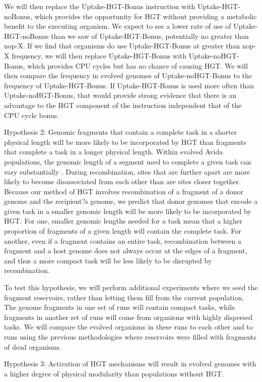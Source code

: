 \begin{mdframed}
We will then replace the Uptake-HGT-Bonus instruction with Uptake-HGT-noBonus, which provides the opportunity for HGT without providing a metabolic benefit to the executing organism. We expect to see a lower rate of use of Uptake-HGT-noBonus than we saw of Uptake-HGT-Bonus, potentially no greater than nop-X. If we find that organisms do use Uptake-HGT-Bonus at greater than nop-X frequency, we will then replace Uptake-HGT-Bonus with Uptake-noHGT-Bonus, which provides CPU cycles but has no chance of causing HGT. We will then compare the frequency in evolved genomes of Uptake-noHGT-Bonus to the frequency of Uptake-HGT-Bonus. If Uptake-HGT-Bonus is used more often than Uptake-noHGT-Bonus, that would provide strong evidence that there is an advantage to the HGT component of the instruction independent that of the CPU cycle bonus. 

Hypothesis 2: Genomic fragments that contain a complete task in a shorter physical length will be more likely to be incorporated by HGT than fragments that complete a task in a longer physical length. Within evolved Avida populations, the genomic length of a segment used to complete a given task can vary substantially \cite{ComplexFeat}. During recombination, sites that are further apart are more likely to become disassociated from each other than are sites closer together. Because our method of HGT involves recombination of a fragment of a donor genome and the recipient?s genome, we predict that donor genomes that encode a given task in a smaller genomic length will be more likely to be incorporated by HGT. For one, smaller genomic lengths needed for a task mean that a higher proportion of fragments of a given length will contain the complete task. For another, even if a fragment contains an entire task, recombination between a fragment and a host genome does not always occur at the edges of a fragment, and thus a more compact task will be less likely to be disrupted by recombination. 

To test this hypothesis, we will perform additional experiments where we seed the fragment reservoirs, rather than letting them fill from the current population. The genome fragments in one set of runs will contain compact tasks, while fragments in another set of runs will come from organisms with highly dispersed tasks. We will compare the evolved organisms in these runs to each other and to runs using the previous methodologies where reservoirs were filled with fragments of dead organisms. 

Hypothesis 3: Activation of HGT mechanisms will result in evolved genomes with a higher degree of physical modularity than populations without HGT. 


\end{mdframed}
